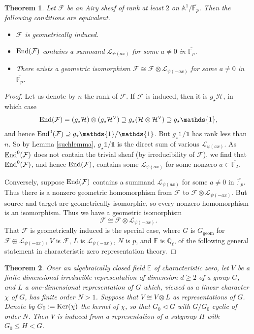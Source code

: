 \documentclass[11pt]{amsart}
\theoremstyle{plain}
\newtheorem{thm}{Theorem}
\theoremstyle{definition}
\numberwithin{thm}{section}
\numberwithin{equation}{thm}
\newcommand{\End}{{\rm End}}
\newcommand{\Ker}{{\rm Ker}}
\newcommand{\sF}{{\mathcal F}}
\newcommand{\sH}{{\mathcal H}}
\newcommand{\sL}{{\mathcal L}}
\newcommand{\A}{{\mathbb A}}
\newcommand{\C}{{\mathbb C}}
\newcommand{\E}{{\mathbb E}}
\newcommand{\F}{{\mathbb F}}
\newcommand{\Q}{{\mathbb Q}}
\newcommand{\0}{\emptyset}
\newcommand{\geo}{{\mathrm {geom}}}
\newcommand{\triv}{{\mathds{1}}}
\begin{document}
 \begin{thm}\label{indiffLpsi}Let $\sF$ be an Airy sheaf of rank at least $2$ on $\A^1/\overline{\F_p}$. Then the following conditions are equivalent.
 \begin{itemize}
 \item[\rm (i)] $\sF$ is geometrically induced.
 \item[\rm (ii)]$\End(\sF)$ contains a summand $\sL_{\psi(ax)}$ for some $a \neq 0$ in $\overline{\F_p}$.
 \item[\rm (iii)]There exists a geometric isomorphism $\sF \cong \sF \otimes \sL_{\psi(-ax)}$ for some $a \neq 0$ in $\overline{\F_p}$.
 \end{itemize}
 \end{thm}
 \begin{proof}
Let us denote by $n$ the rank of $\sF$. If $\sF$ is induced, then it is $g_\star \sH$, in which case 
$$\End(\sF)=(g_\star \sH)\otimes (g_\star \sH^\vee) \supseteq g_\star(\sH\otimes \sH^\vee) \supseteq g_\star\triv,$$
and hence $\End^0(\sF) \supseteq g_\star\triv/\triv$. But $g_\star\triv/\triv$ has rank less than $n$. So by Lemma \ref{suchlemma},
$g_\star\triv/\triv$ is the direct sum of various $\sL_{\psi(ax)}$. As $\End^0(\sF)$ does not contain the trivial sheaf (by irreducibility of $\sF$), we find that $\End^0(\sF)$, and hence  $\End(\sF)$, contains some $\sL_{\psi(ax)}$ for some nonzero $a \in \overline{\F_2}$.

Conversely, suppose $\End(\sF)$ contains a summand $\sL_{\psi(ax)}$ for some $a \neq 0$ in $\overline{\F_p}$. Thus there is a nonzero geometric homomorphism from $\sF$ to $\sF \otimes \sL_{\psi(-ax)}$. But source and target are geometrically isomorphic,
 so every nonzero homomorphism is an isomorphism. Thus we have a geometric isomorphism
 $$\sF \cong \sF\otimes \sL_{\psi(-ax)}.$$
 That $\sF$ is geometrically induced is the special case, where $G$ is $G_{\geo}$ for $\sF \oplus  \sL_{\psi(-ax)}$, $V$ is $\sF$, $L$ is $ \sL_{\psi(-ax)}$, $N$ is $p$, and $\E$ is $\overline{\Q_\ell}$, of 
the following general statement in characteristic zero representation theory.
 \end{proof}

\begin{thm}\label{inductioncriterion}
Over an algebraically closed field  $\E$ of characteristic zero, let
$V$ be a finite dimensional irreducible representation of dimension $d \ge 2$ of a group $G$, and $L$ a one-dimensional representation of $G$ which, viewed as a linear character $\chi$ of $G$, has finite order $N>1$. Suppose that $V \cong V\otimes L$ as representations of $G$. Denote by $G_0:=\Ker(\chi)$ the kernel of $\chi$, so that $G_0 \lhd G$ with $G/G_0$ cyclic of order $N$. Then $V$ is induced from a representation of a subgroup $H$ with $G_0 \leq H < G$.
\end{thm}
 
\end{document}
